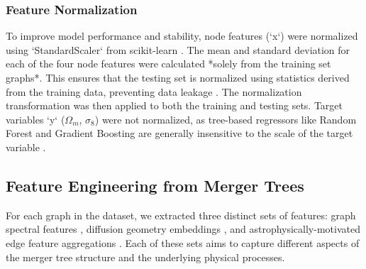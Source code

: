 \documentclass[twocolumn]{aastex631}
\begin{document}
\subsubsection{Feature Normalization}
To improve model performance and stability, node features (`x`) were normalized using `StandardScaler` from scikit-learn \citep{bhowmik2024imageprocessinganalysismultiple}. The mean and standard deviation for each of the four node features were calculated *solely from the training set graphs*. This ensures that the testing set is normalized using statistics derived from the training data, preventing data leakage \citep{różański2021suppnetneuralnetworkstellar}. The normalization transformation was then applied to both the training and testing sets. Target variables `y` ($\Omega_m$, $\sigma_8$) were not normalized, as tree-based regressors like Random Forest and Gradient Boosting are generally insensitive to the scale of the target variable \citep{stonemartinez2025starflowleveragingnormalizingflows}.

\subsection{Feature Engineering from Merger Trees}
For each graph in the dataset, we extracted three distinct sets of features: graph spectral features \citep{jespersen2022textttmangrovelearninggalaxyproperties,bose2022constructinghighfidelityhalomerger}, diffusion geometry embeddings \citep{robles2022deeplearningapproachhalo}, and astrophysically-motivated edge feature aggregations \citep{gómez2021halomergertreecomparison}. Each of these sets aims to capture different aspects of the merger tree structure and the underlying physical processes.
\end{document}
